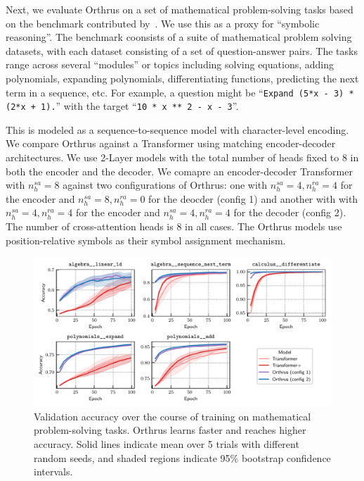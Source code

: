 Next, we evaluate Orthrus on a set of mathematical problem-solving tasks based on the benchmark contributed by~\citet{saxtonAnalyzingMathematicalReasoning2019}. We use this as a proxy for ``symbolic reasoning''. The benchmark coonsists of a suite of mathematical problem solving datasets, with each dataset consisting of a set of question-answer pairs. The tasks range across several ``modules'' or topics including solving equations, adding polynomials, expanding polynomials, differentiating functions, predicting the next term in a sequence, etc. For example, a question might be ``\texttt{Expand (5*x - 3) * (2*x + 1).}'' with the target ``\texttt{10 * x ** 2 - x - 3}''.

This is modeled as a sequence-to-sequence model with character-level encoding. We compare Orthrus against a Transformer using matching encoder-decoder architectures. We use 2-Layer models with the total number of heads fixed to $8$ in both the encoder and the decoder. We comapre an encoder-decoder Transformer with $n_h^{sa} = 8$ against two configurations of Orthrus: one with $n_h^{sa} = 4, n_h^{ra} = 4$ for the encoder and $n_h^{sa} = 8, n_h^{ra} = 0$ for the deocder (config 1) and another with with $n_h^{sa} = 4, n_h^{ra} = 4$ for the encoder and $n_h^{sa} = 4, n_h^{ra} = 4$ for the decoder (config 2). The number of cross-attention heads is $8$ in all cases. The Orthrus models use position-relative symbols as their symbol assignment mechanism.

\begin{figure}
    \includegraphics[width=\textwidth]{figs/experiments/math/math_training_curves_interpolation.pdf}
    \caption{Validation accuracy over the course of training on mathematical problem-solving tasks. Orthrus learns faster and reaches higher accuracy. Solid lines indicate mean over 5 trials with different random seeds, and shaded regions indicate 95\% bootstrap confidence intervals.}\label{fig:math_training_curves_interpolation}
\end{figure}

